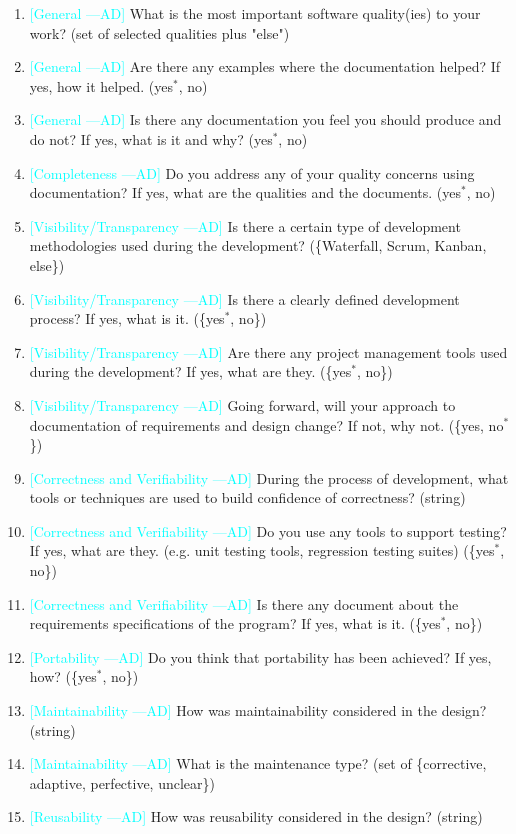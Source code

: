 \documentclass[letterpaper,cleveref]{lipics-v2019}
\newcommand{\authornote}[3]{\textcolor{#1}{[#3 ---#2]}}
\newcommand{\authornote}[3]{}
\newcommand{\ad}[1]{\authornote{cyan}{AD}{#1}} %
\theoremstyle{definition}
\begin{document}
\begin{enumerate}
\item \ad{General} What is the most important software quality(ies) to your work? (set of selected qualities plus "else")
\item \ad{General} Are there any examples where the documentation helped? If yes, how it helped. ({yes$^*$, no})
\item \ad{General} Is there any documentation you feel you should produce and do not? If yes, what is it and why? ({yes$^*$, no})
\item \ad{Completeness} Do you address any of your quality concerns using documentation? If yes, what are the qualities and the documents. ({yes$^*$, no})
\item \ad{Visibility/Transparency} Is there a certain type of development methodologies used during the development? (\{Waterfall, Scrum, Kanban, else\})
\item \ad{Visibility/Transparency} Is there a clearly defined development process? If yes, what is it. (\{yes$^*$, no\})
\item \ad{Visibility/Transparency} Are there any project management tools used during the development? If yes, what are they. (\{yes$^*$, no\})
\item \ad{Visibility/Transparency} Going forward, will your approach to documentation of requirements and design
change? If not, why not. (\{yes, no$^*$\})
\item \ad{Correctness and Verifiability} During the process of development, what tools or techniques are used to build confidence of correctness? (string)
\item \ad{Correctness and Verifiability} Do you use any tools to support testing? If yes, what are they. (e.g. unit testing tools, regression testing suites) (\{yes$^*$, no\})
\item \ad{Correctness and Verifiability} Is there any document about the requirements specifications of the program? If yes, what is it. (\{yes$^*$, no\})
\item \ad{Portability} Do you think that portability has been achieved? If yes, how? (\{yes$^*$, no\})
\item \ad{Maintainability} How was maintainability considered in the design? (string)
\item \ad{Maintainability} What is the maintenance type? (set of \{corrective, adaptive, perfective,
unclear\})
\item \ad{Reusability} How was reusability considered in the design? (string)

\end{enumerate}
\end{document}
